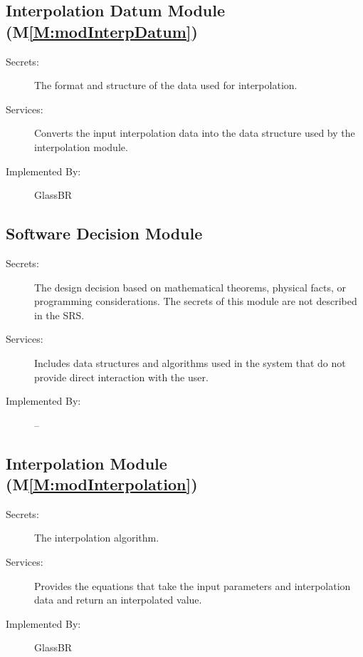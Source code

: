 \documentclass[12pt]{article}
\begin{document}
\subsection{Interpolation Datum Module (M\ref{M:modInterpDatum})}
\label{Sec:InteDatuModu()}
\begin{description}
\item[Secrets:]The format and structure of the data used for interpolation.
\item[Services:]Converts the input interpolation data into the data structure used by the interpolation module.
\item[Implemented By:]GlassBR
\end{description}
\subsection{Software Decision Module}
\label{Sec:SoftDeciModu}
\begin{description}
\item[Secrets:]The design decision based on mathematical theorems, physical facts, or programming considerations. The secrets of this module are not described in the SRS.
\item[Services:]Includes data structures and algorithms used in the system that do not provide direct interaction with the user.
\item[Implemented By:]--
\end{description}
\subsection{Interpolation Module (M\ref{M:modInterpolation})}
\label{Sec:InteModu()}
\begin{description}
\item[Secrets:]The interpolation algorithm.
\item[Services:]Provides the equations that take the input parameters and interpolation data and return an interpolated value.
\item[Implemented By:]GlassBR
\end{description}
\end{document}
